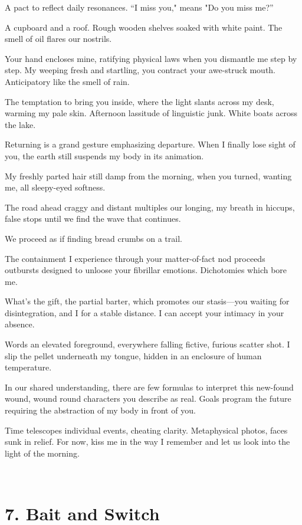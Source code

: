\documentclass[
]{memoir}
\begin{document}
A pact to reflect daily resonances. ``I miss you," means "Do you miss
me?''

A cupboard and a roof. Rough wooden shelves soaked with white paint. The
smell of oil flares our nostrils.

Your hand encloses mine, ratifying physical laws when you dismantle me
step by step. My weeping fresh and startling, you contract your
awe-struck mouth. Anticipatory like the smell of rain.

The temptation to bring you inside, where the light slants across my
desk, warming my pale skin. Afternoon lassitude of linguistic junk.
White boats across the lake.

Returning is a grand gesture emphasizing departure. When I finally lose
sight of you, the earth still suspends my body in its animation.

My freshly parted hair still damp from the morning, when you turned,
wanting me, all sleepy-eyed softness.

The road ahead craggy and distant multiples our longing, my breath in
hiccups, false stops until we find the wave that continues.

We proceed as if finding bread crumbs on a trail.

The containment I experience through your matter-of-fact nod proceeds
outbursts designed to unloose your fibrillar emotions. Dichotomies which
bore me.

What's the gift, the partial barter, which promotes our stasis---you
waiting for disintegration, and I for a stable distance. I can accept
your intimacy in your absence.

Words an elevated foreground, everywhere falling fictive, furious
scatter shot. I slip the pellet underneath my tongue, hidden in an
enclosure of human temperature.

In our shared understanding, there are few formulas to interpret this
new-found wound, wound round characters you describe as real. Goals
program the future requiring the abstraction of my body in front of you.

Time telescopes individual events, cheating clarity. Metaphysical
photos, faces sunk in relief. For now, kiss me in the way I remember and
let us look into the light of the morning.

~

\hypertarget{bait-and-switch}{%
\section*{7. Bait and Switch}\label{bait-and-switch}}
\end{document}
